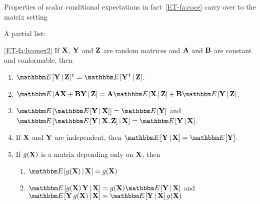 \begin{frame}

    \vspace{2em}
    Properties of scalar conditional
    expectations in fact~\ref{ET-fa:coce} carry over to the matrix setting
    
    A partial list:

    \Fact
    \eqref{ET-fa:liconex2}
    If $\mathbf X$, $\mathbf Y$ and $\mathbf Z$ are random matrices and 
    $\mathbf A$ and $\mathbf B$ are constant and conformable, then
    \begin{enumerate}
        \item $\EE [ \boldY \given \boldZ ]^\T = \EE [ \boldY^\T \given \boldZ ]$. 
        \item $\EE [ \boldA \boldX + \boldB \boldY \given \boldZ ] = 
             \boldA \EE[\boldX \given \boldZ ] + \boldB \EE[ \boldY \given \boldZ  ]$.
        \item $\EE [\EE [ \boldY \given \boldX ] ] = \EE[\boldY]$ and 
            $\EE [\EE [ \boldY \given \boldX, \boldZ ] \given \boldX ] =
            \EE[\boldY \given \boldX]$.
        \item If $\mathbf X$ and $\mathbf Y$ are independent, then $\EE [ \boldY \given \boldX
            ]  = \EE[\boldY]$.
        \item If $g(\mathbf X)$ is a matrix depending only on $\mathbf X$, then 
            \begin{enumerate}
                \item $\EE [ g(\boldX) \given \boldX ] = g(\boldX)$
                \item $\EE [ g(\boldX) \, \boldY \given \boldX ] = g(\boldX) \EE [
                    \boldY \given \boldX ]$ and $\EE [ \boldY \, g(\boldX) \given \boldX ] = \EE [
                    \boldY \given \boldX] \, g(\boldX)$
            \end{enumerate}
    \end{enumerate}
    
\end{frame}
    
    

